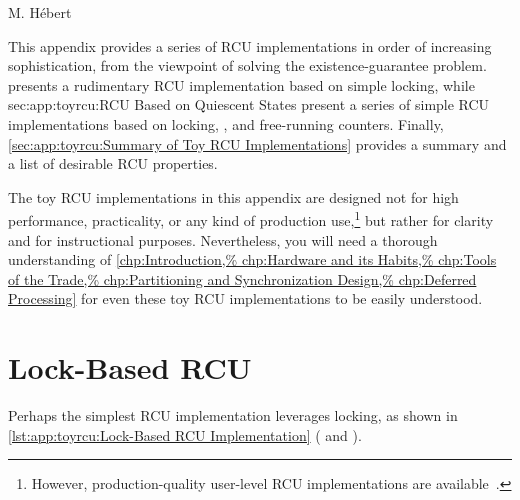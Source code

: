 
%
	 {M. H\'ebert}

This appendix provides a series of RCU implementations in order of
increasing sophistication, from the viewpoint of solving the
existence-guarantee problem.
 presents a rudimentary
RCU implementation based on simple locking, while
{sec:app:toyrcu:RCU Based on Quiescent States}
present a series of
simple RCU implementations based on locking,
,
and free-running counters.
Finally, \cref{sec:app:toyrcu:Summary of Toy RCU Implementations}
provides a summary and a list of desirable RCU properties.

The toy RCU implementations in this appendix are designed not for
high performance, practicality, or any kind of production use,\footnote{
	However, production-quality user-level RCU implementations
	are available~\cite{MathieuDesnoyers2009URCU,MathieuDesnoyers2012URCU}.}
but rather for clarity and for instructional purposes.
Nevertheless, you will need a thorough understanding of
\cref{chp:Introduction,%
chp:Hardware and its Habits,%
chp:Tools of the Trade,%
chp:Partitioning and Synchronization Design,%
chp:Deferred Processing}
for even these toy RCU implementations to be easily understood.

\section{Lock-Based RCU}
\label{sec:app:toyrcu:Lock-Based RCU}

Perhaps the simplest RCU implementation leverages locking, as
shown in
\cref{lst:app:toyrcu:Lock-Based RCU Implementation}
( and ).

\begin{listing}
\vspace*{-11pt}
\caption{Lock-Based RCU Implementation}
\label{lst:app:toyrcu:Lock-Based RCU Implementation}
\end{listing}

